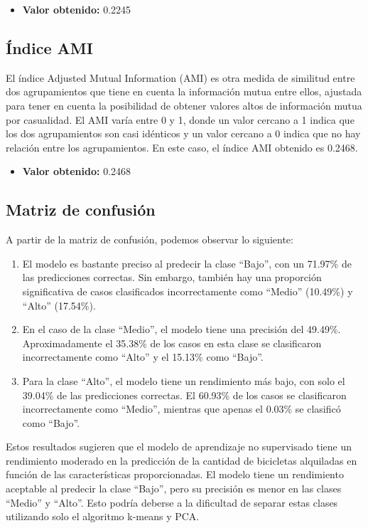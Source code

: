 \documentclass{wsdcr}
\begin{document}
\begin{itemize}
    \item \textbf{Valor obtenido:} 0.2245
\end{itemize}

\subsection{Índice AMI}

El índice Adjusted Mutual Information (AMI) es otra medida de similitud entre dos agrupamientos que tiene en cuenta la información mutua entre ellos, ajustada para tener en cuenta la posibilidad de obtener valores altos de información mutua por casualidad. El AMI varía entre 0 y 1, donde un valor cercano a 1 indica que los dos agrupamientos son casi idénticos y un valor cercano a 0 indica que no hay relación entre los agrupamientos. En este caso, el índice AMI obtenido es 0.2468.

\begin{itemize}
    \item \textbf{Valor obtenido:} 0.2468
\end{itemize}

\subsection{Matriz de confusión}
A partir de la matriz de confusión, podemos observar lo siguiente:
\begin{enumerate}
    \item El modelo es bastante preciso al predecir la clase ``Bajo'', con un 71.97\% de las predicciones correctas. Sin embargo, también hay una proporción significativa de casos clasificados incorrectamente como ``Medio'' (10.49\%) y ``Alto'' (17.54\%).
    \item En el caso de la clase ``Medio'', el modelo tiene una precisión del 49.49\%. Aproximadamente el 35.38\% de los casos en esta clase se clasificaron incorrectamente como ``Alto'' y el 15.13\% como ``Bajo''.
    \item Para la clase ``Alto'', el modelo tiene un rendimiento más bajo, con solo el 39.04\% de las predicciones correctas. El 60.93\% de los casos se clasificaron incorrectamente como ``Medio'', mientras que apenas el 0.03\% se clasificó como ``Bajo''.
\end{enumerate}
Estos resultados sugieren que el modelo de aprendizaje no supervisado tiene un rendimiento moderado en la predicción de la cantidad de bicicletas alquiladas en función de las características proporcionadas. El modelo tiene un rendimiento aceptable al predecir la clase ``Bajo'', pero su precisión es menor en las clases ``Medio'' y ``Alto''. Esto podría deberse a la dificultad de separar estas clases utilizando solo el algoritmo k-means y PCA.
\end{document}

